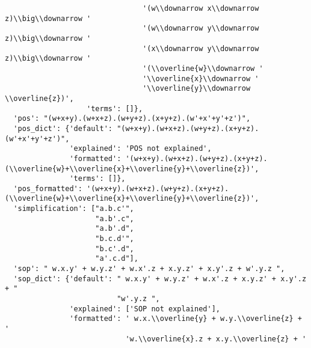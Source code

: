 \begin{verbatim}
                                '(w\\downarrow x\\downarrow z)\\big\\downarrow '
                                '(w\\downarrow y\\downarrow z)\\big\\downarrow '
                                '(x\\downarrow y\\downarrow z)\\big\\downarrow '
                                '(\\overline{w}\\downarrow '
                                '\\overline{x}\\downarrow '
                                '\\overline{y}\\downarrow \\overline{z})',
                   'terms': []},
  'pos': "(w+x+y).(w+x+z).(w+y+z).(x+y+z).(w'+x'+y'+z')",
  'pos_dict': {'default': "(w+x+y).(w+x+z).(w+y+z).(x+y+z).(w'+x'+y'+z')",
               'explained': 'POS not explained',
               'formatted': '(w+x+y).(w+x+z).(w+y+z).(x+y+z).(\\overline{w}+\\overline{x}+\\overline{y}+\\overline{z})',
               'terms': []},
  'pos_formatted': '(w+x+y).(w+x+z).(w+y+z).(x+y+z).(\\overline{w}+\\overline{x}+\\overline{y}+\\overline{z})',
  'simplification': ["a.b.c'",
                     "a.b'.c",
                     "a.b'.d",
                     "b.c.d'",
                     "b.c'.d",
                     "a'.c.d"],
  'sop': " w.x.y' + w.y.z' + w.x'.z + x.y.z' + x.y'.z + w'.y.z ",
  'sop_dict': {'default': " w.x.y' + w.y.z' + w.x'.z + x.y.z' + x.y'.z + "
                          "w'.y.z ",
               'explained': ['SOP not explained'],
               'formatted': ' w.x.\\overline{y} + w.y.\\overline{z} + '
                            'w.\\overline{x}.z + x.y.\\overline{z} + '

\end{verbatim}
